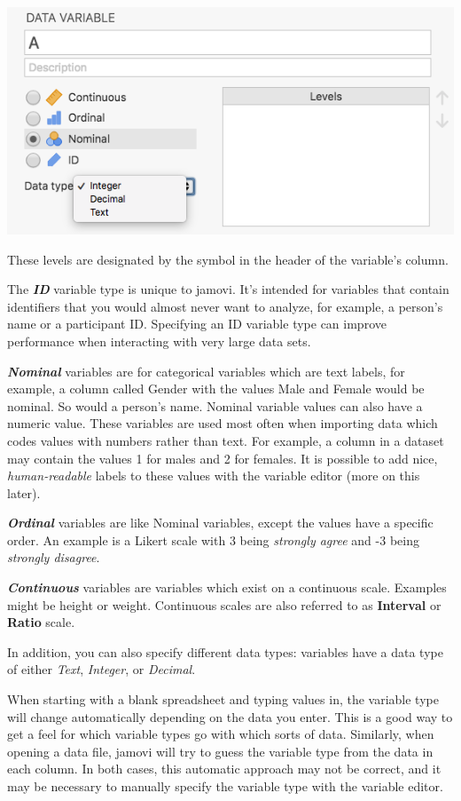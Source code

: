 \documentclass[
]{book}
\begin{document}
\includegraphics{img/measurementlevels.png}

These levels are designated by the symbol in the header of the variable's column.

The \textbf{\emph{ID}} variable type is unique to jamovi. It's intended for variables that contain identifiers that you would almost never want to analyze, for example, a person's name or a participant ID. Specifying an ID variable type can improve performance when interacting with very large data sets.

\textbf{\emph{Nominal}} variables are for categorical variables which are text labels, for example, a column called Gender with the values Male and Female would be nominal. So would a person's name. Nominal variable values can also have a numeric value. These variables are used most often when importing data which codes values with numbers rather than text. For example, a column in a dataset may contain the values 1 for males and 2 for females. It is possible to add nice, \emph{human-readable} labels to these values with the variable editor (more on this later).

\textbf{\emph{Ordinal}} variables are like Nominal variables, except the values have a specific order. An example is a Likert scale with 3 being \emph{strongly agree} and -3 being \emph{strongly disagree}.

\textbf{\emph{Continuous}} variables are variables which exist on a continuous scale. Examples might be height or weight. Continuous scales are also referred to as \textbf{Interval} or \textbf{Ratio} scale.

In addition, you can also specify different data types: variables have a data type of either \emph{Text}, \emph{Integer}, or \emph{Decimal}.

When starting with a blank spreadsheet and typing values in, the variable type will change automatically depending on the data you enter. This is a good way to get a feel for which variable types go with which sorts of data. Similarly, when opening a data file, jamovi will try to guess the variable type from the data in each column. In both cases, this automatic approach may not be correct, and it may be necessary to manually specify the variable type with the variable editor.
\end{document}
